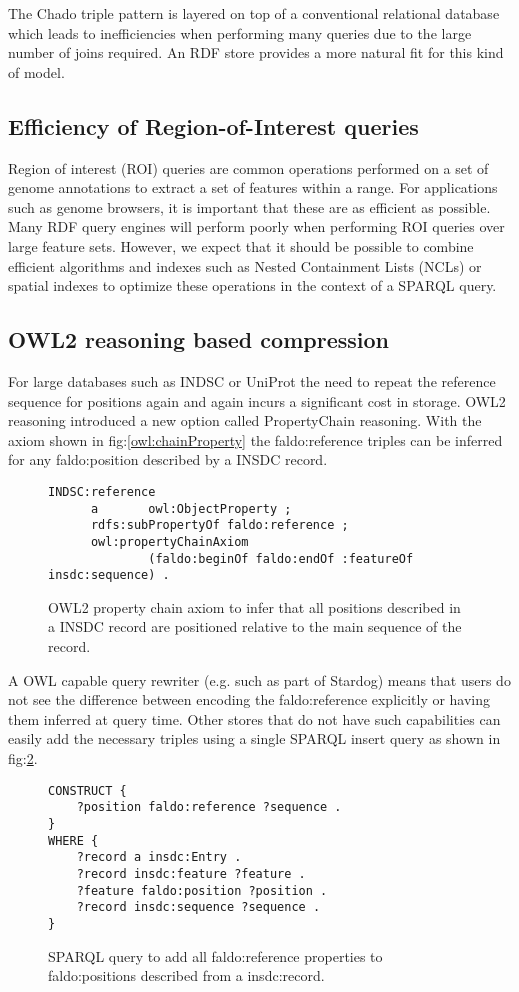 The Chado triple pattern is layered on top of a conventional
relational database which leads to inefficiencies when performing many
queries due to the large number of joins required. An RDF store
provides a more natural fit for this kind of model.

\subsection*{Efficiency of Region-of-Interest queries}

Region of interest (ROI) queries are common operations performed on a
set of genome annotations to extract a set of features within a
range. For applications such as genome browsers, it is important that
these are as efficient as possible. Many RDF query engines will
perform poorly when performing ROI queries over large feature
sets. However, we expect that it should be possible to combine
efficient algorithms and indexes such as Nested Containment Lists
(NCLs)\cite{NCL2007} or spatial indexes to optimize these operations
in the context of a SPARQL query.



\subsection*{OWL2 reasoning based compression}
For large databases such as INDSC or UniProt the need to repeat the reference sequence for positions again and again incurs a significant cost in storage.
OWL2 reasoning introduced a new option called PropertyChain reasoning. 
With the axiom shown in fig:\ref{owl:chainProperty} the faldo:reference triples can be inferred for any faldo:position described by a INSDC record.
\begin{figure}
\begin{verbatim}
INDSC:reference
      a       owl:ObjectProperty ;
      rdfs:subPropertyOf faldo:reference ;
      owl:propertyChainAxiom
              (faldo:beginOf faldo:endOf :featureOf insdc:sequence) .
\end{verbatim}
\caption{OWL2 property chain axiom to infer that all positions described in a INSDC record are positioned relative to the main sequence of the record.}
\label{owl:chainProprty}
\end{figure}
A OWL capable query rewriter (e.g. such as part of Stardog) means that users do not see the difference between encoding the faldo:reference explicitly or having them inferred at query time.
Other stores that do not have such capabilities can easily add the necessary triples using a single SPARQL insert query as shown in fig:\ref{sparql:chainProperty}.
\begin{figure}
\begin{verbatim}
CONSTRUCT {
    ?position faldo:reference ?sequence .
}
WHERE {
    ?record a insdc:Entry .
    ?record insdc:feature ?feature .
    ?feature faldo:position ?position .
    ?record insdc:sequence ?sequence .
}
\end{verbatim}
\caption{SPARQL query to add all faldo:reference properties to faldo:positions described from a insdc:record.}
\label{sparql:chainProperty}
\end{figure}

